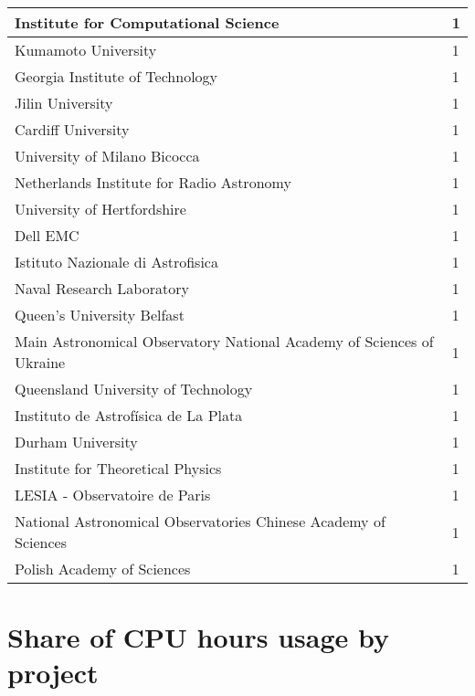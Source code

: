 \documentclass{article}%
\begin{document}
\begin{longtabu}{X[l] X[r]}
\hline%
Institute for Computational Science&1\\%
\hline%
Kumamoto University&1\\%
\hline%
Georgia Institute of Technology&1\\%
\hline%
Jilin University&1\\%
\hline%
Cardiff University&1\\%
\hline%
University of Milano Bicocca&1\\%
\hline%
Netherlands Institute for Radio Astronomy&1\\%
\hline%
University of Hertfordshire&1\\%
\hline%
Dell EMC&1\\%
\hline%
Istituto Nazionale di Astrofisica&1\\%
\hline%
Naval Research Laboratory&1\\%
\hline%
Queen's University Belfast&1\\%
\hline%
Main Astronomical Observatory National Academy of Sciences of Ukraine&1\\%
\hline%
Queensland University of Technology&1\\%
\hline%
Instituto de Astrofísica de La Plata&1\\%
\hline%
Durham University&1\\%
\hline%
Institute for Theoretical Physics&1\\%
\hline%
LESIA {-} Observatoire de Paris&1\\%
\hline%
National Astronomical Observatories Chinese Academy of Sciences&1\\%
\hline%
Polish Academy of Sciences&1\\%
\hline%
\end{longtabu}%
\section{Share of CPU hours usage by project}%
\end{document}
